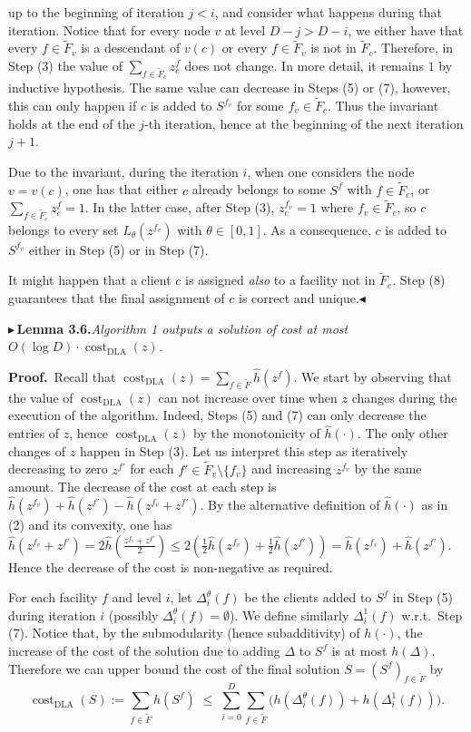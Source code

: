\documentclass[11pt]{article}
\newcommand{\costDLA}{\operatorname{cost}_{\mathrm{DLA}}}
\newcommand{\tF}{\tilde F}
\newcommand{\hatt}[1]{\hat{#1}}
\newcommand{\pitem}[2]{\par\medskip\noindent$\blacktriangleright$\,\textbf{#1}\;\textit{#2}\par\medskip}
\begin{document}
\medskip
up to the beginning of iteration $j<i$, and consider what happens during that iteration.
Notice that for every node $v$ at level $D-j>D-i$, we either have that every $f\in\tF_v$ is a
descendant of $v(c)$ or every $f\in\tF_v$ is not in $\tF_c$. Therefore, in Step (3) the value of $\sum_{f\in\tF_c}z_c^f$
does not change. In more detail, it remains $1$ by inductive hypothesis. The same value can
decrease in Steps (5) or (7), however, this can only happen if $c$ is added to $S^{f_v}$ for some
$f_v\in\tF_c$. Thus the invariant holds at the end of the $j$-th iteration, hence at the beginning of
the next iteration $j+1$.

Due to the invariant, during the iteration $i$, when one considers the node $v=v(c)$, one
has that either $c$ already belongs to some $S^f$ with $f\in\tF_c$, or $\sum_{f\in\tF_c}z_c^f=1$. In the latter
case, after Step (3), $z_c^{f_v}=1$ where $f_v\in\tF_c$, so $c$ belongs to every set $L_\theta(z^{f_v})$ with $\theta\in[0,1]$.
As a consequence, $c$ is added to $S^{f_v}$ either in Step (5) or in Step (7).

It might happen that a client $c$ is assigned \textit{also} to a facility not in $\tF_c$. Step (8) guarantees
that the final assignment of $c$ is correct and unique.\hfill$\blacktriangleleft$

\pitem{Lemma 3.6.}{Algorithm 1 outputs a solution of cost at most $O(\log D)\cdot\costDLA(z)$.}

\noindent\textbf{Proof.}\ Recall that $\costDLA(z)=\sum_{f\in\tF}\hatt h(z^f)$. We start by observing that the value of
$\costDLA(z)$ can not increase over time when $z$ changes during the execution of the algorithm.
Indeed, Steps (5) and (7) can only decrease the entries of $z$, hence $\costDLA(z)$ by the
monotonicity of $\hatt h(\cdot)$. The only other changes of $z$ happen in Step (3). Let us interpret
this step as iteratively decreasing to zero $z^{f'}$ for each $f'\in\tF_v\setminus\{f_v\}$ and increasing $z^{f_v}$ by
the same amount. The decrease of the cost at each step is $\hatt h(z^{f_v})+\hatt h(z^{f'})-\hatt h(z^{f_v}+z^{f'})$.
By the alternative definition of $\hatt h(\cdot)$ as in (2) and its convexity, one has $\hatt h(z^{f_v}+z^{f'})=
2\hatt h\!\left(\frac{z^{f_v}+z^{f'}}{2}\right)\le 2\left(\frac12\hatt h(z^{f_v})+\frac12\hatt h(z^{f'})\right)=\hatt h(z^{f_v})+\hatt h(z^{f'})$. Hence the decrease of the cost is
non-negative as required.

For each facility $f$ and level $i$, let $\Delta_i^\theta(f)$ be the clients added to $S^f$ in Step (5) during
iteration $i$ (possibly $\Delta_i^\theta(f)=\emptyset$). We define similarly $\Delta_i^1(f)$ w.r.t.\ Step (7). Notice that, by
the submodularity (hence subadditivity) of $h(\cdot)$, the increase of the cost of the solution due
to adding $\Delta$ to $S^f$ is at most $h(\Delta)$. Therefore we can upper bound the cost of the final
solution $S=(S^f)_{f\in\tF}$ by
\[
\costDLA(S):=\sum_{f\in\tF}h(S^f)\;\le\;\sum_{i=0}^{D}\sum_{f\in\tF}\Big(h(\Delta_i^\theta(f))+h(\Delta_i^1(f))\Big).
\]
\end{document}
